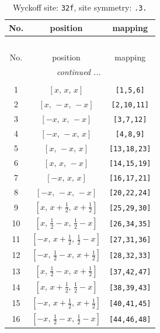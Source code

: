 \documentclass[fleqn,8pt]{jsarticle}
\begin{document}
\begin{longtable}{ccc}
\caption{Wyckoff site: {\tt 32f}, site symmetry: {\tt .3.}}
 \\
 \hline \hline
No. & position & mapping \\ \hline \endfirsthead

\multicolumn{2}{l}{\tablename\ \thetable{}} \\
 \hline \hline
No. & position & mapping \\ \hline \endhead

 \hline \hline
\multicolumn{2}{r}{\footnotesize\it continued ...} \\ \endfoot

 \hline \hline
\multicolumn{2}{r}{} \\ \endlastfoot

1 & $\left[ x,\, x,\, x \right]$ & {\tt [1,5,6]} \\ \hline
2 & $\left[ x,\, - x,\, - x \right]$ & {\tt [2,10,11]} \\ \hline
3 & $\left[ - x,\, x,\, - x \right]$ & {\tt [3,7,12]} \\ \hline
4 & $\left[ - x,\, - x,\, x \right]$ & {\tt [4,8,9]} \\ \hline
5 & $\left[ x,\, - x,\, x \right]$ & {\tt [13,18,23]} \\ \hline
6 & $\left[ x,\, x,\, - x \right]$ & {\tt [14,15,19]} \\ \hline
7 & $\left[ - x,\, x,\, x \right]$ & {\tt [16,17,21]} \\ \hline
8 & $\left[ - x,\, - x,\, - x \right]$ & {\tt [20,22,24]} \\ \hline
9 & $\left[ x,\, x + \frac{1}{2},\, x + \frac{1}{2} \right]$ & {\tt [25,29,30]} \\ \hline
10 & $\left[ x,\, \frac{1}{2} - x,\, \frac{1}{2} - x \right]$ & {\tt [26,34,35]} \\ \hline
11 & $\left[ - x,\, x + \frac{1}{2},\, \frac{1}{2} - x \right]$ & {\tt [27,31,36]} \\ \hline
12 & $\left[ - x,\, \frac{1}{2} - x,\, x + \frac{1}{2} \right]$ & {\tt [28,32,33]} \\ \hline
13 & $\left[ x,\, \frac{1}{2} - x,\, x + \frac{1}{2} \right]$ & {\tt [37,42,47]} \\ \hline
14 & $\left[ x,\, x + \frac{1}{2},\, \frac{1}{2} - x \right]$ & {\tt [38,39,43]} \\ \hline
15 & $\left[ - x,\, x + \frac{1}{2},\, x + \frac{1}{2} \right]$ & {\tt [40,41,45]} \\ \hline
16 & $\left[ - x,\, \frac{1}{2} - x,\, \frac{1}{2} - x \right]$ & {\tt [44,46,48]} \\ \hline

\end{longtable}
\end{document}
